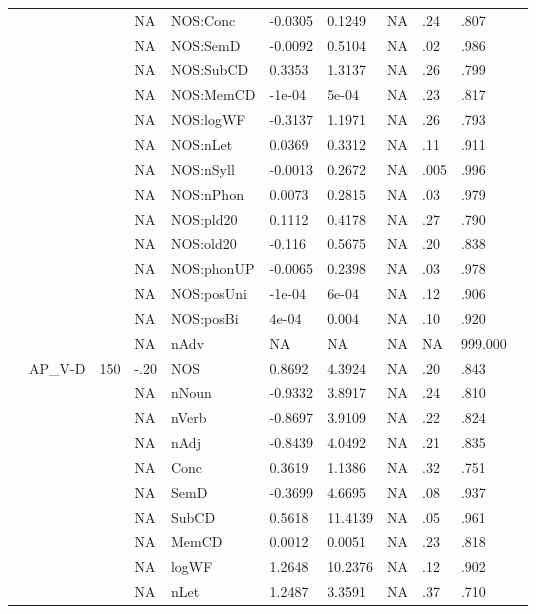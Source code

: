 \begin{table}[ht]
\begin{tabular}{lllllllllll}
   &  &  & NA & NOS:Conc & -0.0305 & 0.1249 & NA & .24 & .807 &   \\ 
   &  &  & NA & NOS:SemD & -0.0092 & 0.5104 & NA & .02 & .986 &   \\ 
   &  &  & NA & NOS:SubCD & 0.3353 & 1.3137 & NA & .26 & .799 &   \\ 
   &  &  & NA & NOS:MemCD & -1e-04 & 5e-04 & NA & .23 & .817 &   \\ 
   &  &  & NA & NOS:logWF & -0.3137 & 1.1971 & NA & .26 & .793 &   \\ 
   &  &  & NA & NOS:nLet & 0.0369 & 0.3312 & NA & .11 & .911 &   \\ 
   &  &  & NA & NOS:nSyll & -0.0013 & 0.2672 & NA & .005 & .996 &   \\ 
   &  &  & NA & NOS:nPhon & 0.0073 & 0.2815 & NA & .03 & .979 &   \\ 
   &  &  & NA & NOS:pld20 & 0.1112 & 0.4178 & NA & .27 & .790 &   \\ 
   &  &  & NA & NOS:old20 & -0.116 & 0.5675 & NA & .20 & .838 &   \\ 
   &  &  & NA & NOS:phonUP & -0.0065 & 0.2398 & NA & .03 & .978 &   \\ 
   &  &  & NA & NOS:posUni & -1e-04 & 6e-04 & NA & .12 & .906 &   \\ 
   &  &  & NA & NOS:posBi & 4e-04 & 0.004 & NA & .10 & .920 &   \\ 
   &  &  & NA & nAdv & NA & NA & NA & NA & 999.000 &  \\ 
   & AP\_V-D & 150 & -.20 & NOS & 0.8692 & 4.3924 & NA & .20 & .843 &   \\ 
   &  &  & NA & nNoun & -0.9332 & 3.8917 & NA & .24 & .810 &   \\ 
   &  &  & NA & nVerb & -0.8697 & 3.9109 & NA & .22 & .824 &   \\ 
   &  &  & NA & nAdj & -0.8439 & 4.0492 & NA & .21 & .835 &   \\ 
   &  &  & NA & Conc & 0.3619 & 1.1386 & NA & .32 & .751 &   \\ 
   &  &  & NA & SemD & -0.3699 & 4.6695 & NA & .08 & .937 &   \\ 
   &  &  & NA & SubCD & 0.5618 & 11.4139 & NA & .05 & .961 &   \\ 
   &  &  & NA & MemCD & 0.0012 & 0.0051 & NA & .23 & .818 &   \\ 
   &  &  & NA & logWF & 1.2648 & 10.2376 & NA & .12 & .902 &   \\ 
   &  &  & NA & nLet & 1.2487 & 3.3591 & NA & .37 & .710 &   \\ 

\end{tabular}
\end{table}
